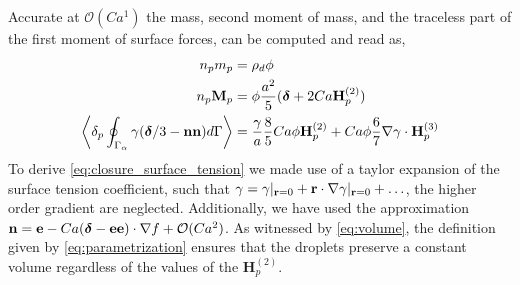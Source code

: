  
Accurate at $\mathcal{O}(Ca^1)$ the mass, second moment of mass, and the traceless part of the first moment of surface forces, can be computed and read as,
\begin{align}
    n_p m_p &= \rho_d \phi   
    \label{eq:volume}
    \\ 
    \label{eq:second_moment_of_mass}
    n_p \textbf{M}_p &= \phi \frac{a^2}{5}(\bm\delta+2Ca \textbf{H}_p^{(2)}) \\
    \pSavg{\gamma (\bm\delta/3 - \textbf{nn})} &=\frac{\gamma}{a}\frac{8}{5} Ca \phi \textbf{H}_p^{(2)}
    + 
    Ca  \phi  \frac{6}{7}\grad\gamma\cdot \textbf{H}^{(3)}_p
    \label{eq:closure_surface_tension}
\end{align}
To derive \ref{eq:closure_surface_tension} we made use of a taylor expansion of the surface tension coefficient, such that $\gamma = \gamma|_{\textbf{r}=0}+ \textbf{r}\cdot \mathbf{\nabla}\gamma|_{\textbf{r}=0}+ \ldots$, the higher order gradient are neglected. 
Additionally, we have used the approximation $\textbf{n} = \textbf{e} - Ca (\bm\delta - \textbf{e}\textbf{e})\cdot \mathbf{\nabla} f + \mathcal{O}(Ca^2)$.  
As witnessed by \ref{eq:volume}, the definition given by \ref{eq:parametrization} ensures that the droplets preserve a constant volume regardless of the values of the $\textbf{H}_p^{(2)}$. 

